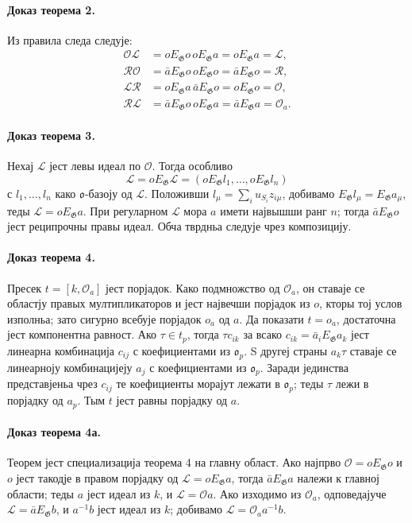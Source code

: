 ﻿\documentclass[11pt]{article}
\providecommand{\Gg}{\mathfrak G}
\providecommand{\oo}{\mathfrak o}
\begin{document}
\paragraph{Доказ теорема 2.}
Из правила следа следује:
\[
\begin{aligned}
 \mathcal O\mathcal L&=oE_\Gg o\,oE_\Gg a=oE_\Gg a=\mathcal L,\\
 \mathcal R\mathcal O&=\bar aE_\Gg o\,oE_\Gg o=\bar aE_\Gg o=\mathcal R,\\
 \mathcal L\mathcal R&=oE_\Gg a\,\bar aE_\Gg o=oE_\Gg o=\mathcal O,\\
 \mathcal R\mathcal L&=\bar aE_\Gg o\,oE_\Gg a=\bar aE_\Gg a=\mathcal O_a.
\end{aligned}
\]

\paragraph{Доказ теорема 3.}
Нехај \(\mathcal L\) јест левы идеал по \(\mathcal O\). Тогда особливо
\[
        \mathcal L=oE_\Gg\mathcal L
        =(oE_\Gg l_1,\ldots,oE_\Gg l_n)
\]
с \(l_1,\ldots,l_n\) како \(\oo\)-базоју од \(\mathcal L\). Положивши \(l_\mu=\sum_i u_{S_i}z_{i\mu}\), добивамо \(E_\Gg l_\mu=E_\Gg a_\mu\), теды \(\mathcal L=oE_\Gg a\). При регуларном \(\mathcal L\) мора \(a\) имети највышши ранг \(n\); тогда \(\bar aE_\Gg o\) јест реципрочны правы идеал. Обча тврдньа следује чрез композицију.

\paragraph{Доказ теорема 4.}
Пресек \(t=[k,\mathcal O_a]\) јест порјадок. Како подмножство од \(\mathcal O_a\), он ставаје се областју правых мултипликаторов и јест највечши порјадок из \(o\), кторы тој услов изполньа; зато сигурно всебује порјадок \(o_a\) од \(a\). Да показати \(t=o_a\), достаточна јест компонентна равност. Ако \(\tau\in t_p\), тогда \(\tau c_{ik}\) за всако \(c_{ik}=\bar a_iE_\Gg a_k\) јест линеарна комбинација \(c_{ij}\) с коефициентами из \(\oo_p\). S другеј страны \(a_k\tau\) ставаје се линеарноју комбинацијеју \(a_j\) с коефициентами из \(\oo_p\). Заради јединства представјеньа чрез \(c_{ij}\) те коефициенты морајут лежати в \(\oo_p\); теды \(\tau\) лежи в порјадку од \(a_p\). Тым \(t\) јест равны порјадку од \(a\).

\paragraph{Доказ теорема 4а.}
Теорем јест специализација теорема 4 на главну област. Ако најпрво \(\mathcal O=oE_\Gg o\) и \(o\) јест такодје в правом порјадку од \(\mathcal L=oE_\Gg a\), тогда \(\bar aE_\Gg a\) належи к главној области; теды \(a\) јест идеал из \(k\), и \(\mathcal L=\mathcal O a\). Ако изходимо из \(\mathcal O_a\), одповедајуче \(\mathcal L=\bar aE_\Gg b\), и \(a^{-1}b\) јест идеал из \(k\); добивамо \(\mathcal L=\mathcal O_a a^{-1}b\).
\end{document}
